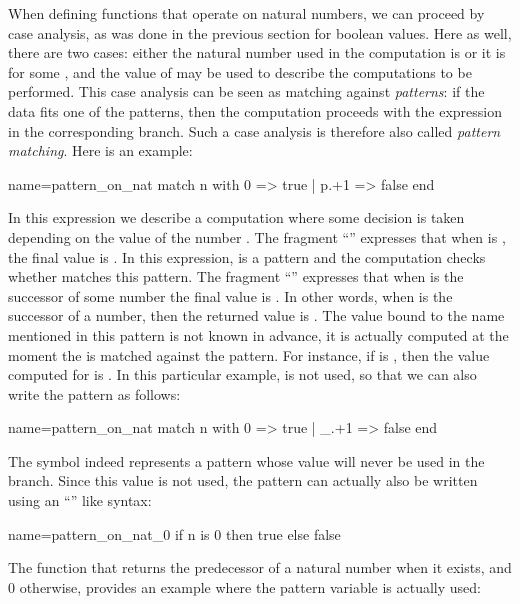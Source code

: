 When defining functions that operate on natural numbers, we can
proceed by case analysis, as was done in the previous section for boolean
values. Here as well, there are two cases: either the natural number used in
the computation is  or it is  for
some , and the value of  may be used to describe the
computations to be performed. This case analysis can be seen as
matching against \emph{patterns}: if the data fits one of
the patterns, then the computation proceeds with the expression in the
corresponding branch.  Such a case analysis is therefore also called
\emph{pattern matching}. Here is an example:

\begin{coq}{name=pattern_on_nat}{}
match n with 0 => true | p.+1 => false end
\end{coq}
In this expression we describe a computation where some decision is
taken depending on the value of the number .  The fragment
``'' expresses that when  is , the final value is
.  In this expression,  is a pattern and the computation
checks whether  matches this pattern.  The fragment
``''  expresses that when  is the successor of
some number  the final value is .  In other words, when
 is the successor of a number, then the returned value is
.  The value bound to the name  mentioned in this pattern is not
known in advance, it is actually computed at the moment the  is matched
against the pattern.  For instance, if  is , then the value computed
for  is .  In this particular example,  is not used, so that we
can also write the pattern as follows:

\begin{coq}{name=pattern_on_nat}{}
match n with 0 => true | _.+1 => false end
\end{coq}
The symbol \C{_} indeed represents a pattern whose value will never be
used in the branch. Since this value is not used, the pattern can
actually also be written using an ``'' like
syntax:

\begin{coq}{name=pattern_on_nat_0}{}
if n is 0 then true else false
\end{coq}

The  function that returns the predecessor of a natural number
when it exists, and 0 otherwise, provides an example where the pattern
variable is actually used:

